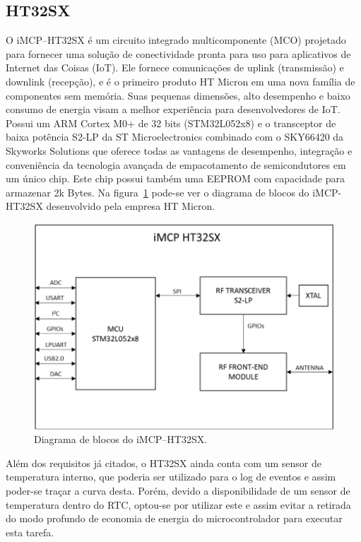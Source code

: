 \subsection{HT32SX}\label{sc:HT32SX}
O iMCP–HT32SX é um circuito integrado multicomponente (MCO) projetado para fornecer uma solução de conectividade pronta para uso para aplicativos de Internet das Coisas (IoT). Ele fornece comunicações de uplink (transmissão) e downlink (recepção), e é o primeiro produto HT Micron em uma nova família de componentes sem memória. Suas pequenas dimensões, alto desempenho e baixo consumo de energia visam a melhor experiência para desenvolvedores de IoT. Possui um ARM Cortex M0+ de 32 bits (STM32L052x8) e o transceptor de baixa potência S2-LP da ST Microelectronics combinado com o SKY66420 da Skyworks Solutions que oferece todas as vantagens de desempenho, integração e conveniência da tecnologia avançada de empacotamento de semicondutores em um único chip. Este chip possui também uma EEPROM com capacidade para armazenar 2k Bytes. Na figura~\ref{fig:blockHT32SX} pode-se ver o diagrama de blocos do iMCP-HT32SX desenvolvido pela empresa HT Micron.

\begin{figure}
  \caption{Diagrama de blocos do iMCP–HT32SX.}
  \begin{center}
      \includegraphics[scale=0.5]{img/imcpHT32sx.png}
  \end{center}
  \label{fig:blockHT32SX}
\end{figure}

Além dos requisitos já citados, o HT32SX ainda conta com um sensor de temperatura interno, que poderia ser utilizado para o log de eventos e assim poder-se traçar a curva desta. Porém, devido a disponibilidade de um sensor de temperatura dentro do RTC, optou-se por utilizar este e assim evitar a retirada do modo profundo de economia de energia do microcontrolador para executar esta tarefa.
